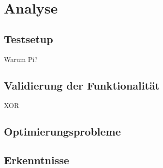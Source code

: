 \chapter{Analyse}

\section{Testsetup}
Warum Pi?
\section{Validierung der Funktionalität}
XOR
\section{Optimierungsprobleme}
\section{Erkenntnisse}
